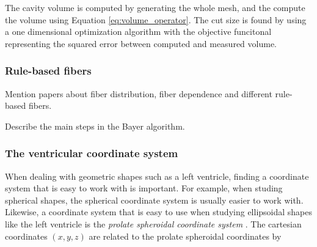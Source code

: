 \begin{figure}[htbp]
\begin{subfigure}[t]{0.45\textwidth}
    \caption{\label{fig:markers_full}}
  \end{subfigure}
\caption{}
\label{fig:echopac_output}
\end{figure}



\begin{remark}
  The cavity volume is computed by generating the whole mesh, and the
  compute the volume using Equation \eqref{eq:volume_operator}. The cut size is
  found by using a one dimensional optimization algorithm with
  the objective funcitonal representing the squared error between
  computed and measured volume.
\end{remark}




\subsubsection{Rule-based fibers}
\label{sec:rule_based_fiber}
Mention papers about fiber distribution, fiber dependence and
different rule-based fibers.

Describe the main steps in the Bayer algorithm. 


\subsubsection{The ventricular coordinate system}

When dealing with geometric shapes such as a left ventricle, finding a
coordinate system that is easy to work with is important. For
example, when studing spherical shapes, the spherical coordinate system is
usually easier to work with. Likewise, a coordinate system that is
easy to use when studying ellipsoidal shapes like the left ventricle is
the \emph{prolate spheroidal coordinate system} \cite{hunter1996kd}. 
The cartesian coordinates $(x,y,z)$ are related to the prolate
spheroidal coordinates by

